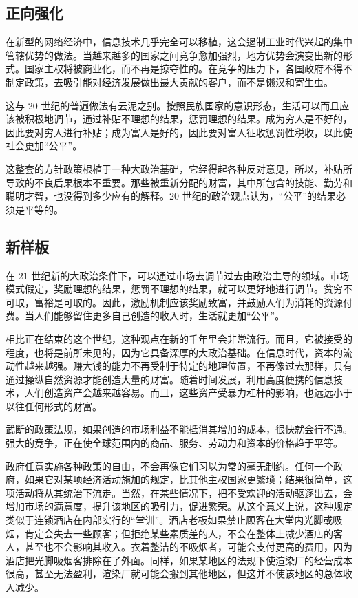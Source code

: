 \subsection{正向强化}
在新型的网络经济中，信息技术几乎完全可以移植，这会遏制工业时代兴起的集中管辖优势的做法。当越来越多的国家之间竞争愈加强烈，地方优势会演变出新的形式。国家主权将被商业化，而不再是掠夺性的。在竞争的压力下，各国政府不得不制定政策，去吸引能对经济发展做出最大贡献的客户，而不是懒汉和寄生虫。

这与 20 世纪的普遍做法有云泥之别。按照民族国家的意识形态，生活可以而且应该被积极地调节，通过补贴不理想的结果，惩罚理想的结果。成为穷人是不好的，因此要对穷人进行补贴；成为富人是好的，因此要对富人征收惩罚性税收，以此使社会更加“公平”。

这整套的方针政策根植于一种大政治基础，它经得起各种反对意见，所以，补贴所导致的不良后果根本不重要。那些被重新分配的财富，其中所包含的技能、勤劳和聪明才智，也没得到多少应有的解释。20 世纪的政治观点认为，“公平”的结果必须是平等的。

\subsection{新样板}
在 21 世纪新的大政治条件下，可以通过市场去调节过去由政治主导的领域。市场模式假定，奖励理想的结果，惩罚不理想的结果，就可以更好地进行调节。贫穷不可取，富裕是可取的。因此，激励机制应该奖励致富，并鼓励人们为消耗的资源付费。当人们能够留住更多自己创造的收入时，生活就更加“公平”。

相比正在结束的这个世纪，这种观点在新的千年里会非常流行。而且，它被接受的程度，也将是前所未见的，因为它具备深厚的大政治基础。在信息时代，资本的流动性越来越强。赚大钱的能力不再受制于特定的地理位置，不再像过去那样，只有通过操纵自然资源才能创造大量的财富。随着时间发展，利用高度便携的信息技术，人们创造资产会越来越容易。而且，这些资产受暴力杠杆的影响，也远远小于以往任何形式的财富。

武断的政策法规，如果创造的市场利益不能抵消其增加的成本，很快就会行不通。强大的竞争，正在使全球范围内的商品、服务、劳动力和资本的价格趋于平等。

政府任意实施各种政策的自由，不会再像它们习以为常的毫无制约。任何一个政府，如果它对某项经济活动施加的规定，比其他主权国家更繁琐；结果很简单，这项活动将从其统治下流走。当然，在某些情况下，把不受欢迎的活动驱逐出去，会增加市场的满意度，提升该地区的吸引力，促进繁荣。从这个意义上说，这种规定类似于连锁酒店在内部实行的“堂训”。酒店老板如果禁止顾客在大堂内光脚或吸烟，肯定会失去一些顾客；但拒绝某些素质差的人，不会在整体上减少酒店的客人，甚至也不会影响其收入。衣着整洁的不吸烟者，可能会支付更高的费用，因为酒店把光脚吸烟客排除在了外面。同样，如果某地区的法规下使渲染厂的经营成本很高，甚至无法盈利，渲染厂就可能会搬到其他地区，但这并不使该地区的总体收入减少。

